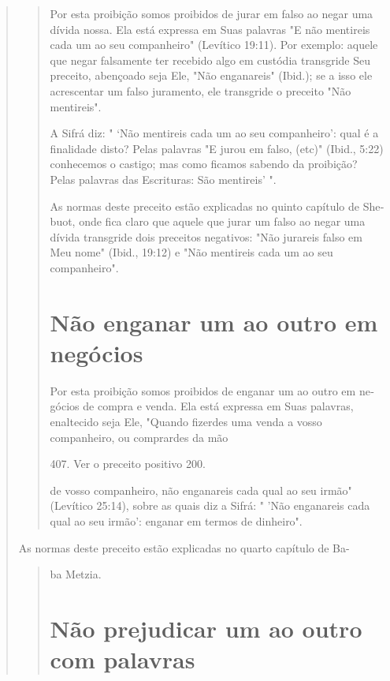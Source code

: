 \begin{quote}
\begin{quote}
Por esta proibição somos proibidos de jurar em falso ao negar uma dívida
nossa. Ela está expressa em Suas palavras "E não mentireis cada um ao
seu companheiro" (Levítico 19:11). Por exemplo: aquele que negar
falsamente ter recebido algo em custódia transgride Seu preceito,
abençoado seja Ele, "Não enganareis" (Ibid.); se a isso ele acrescentar
um falso juramento, ele transgride o preceito "Não mentireis".

A Sifrá diz: " `Não mentireis cada um ao seu companheiro': qual é a
finalidade disto? Pelas palavras "E jurou em falso, (etc)" (Ibid., 5:22)
conhe­cemos o castigo; mas como ficamos sabendo da proibição? Pelas
palavras das Escrituras: São mentireis' ".

As normas deste preceito estão explicadas no quinto capítulo de
She­buot, onde fica claro que aquele que jurar um falso ao negar uma
dívida trans­gride dois preceitos negativos: "Não jurareis falso em Meu
nome" (Ibid., 19:12) e "Não mentireis cada um ao seu companheiro".

\section{Não enganar um ao outro em negócios}

Por esta proibição somos proibidos de enganar um ao outro em ne­gócios
de compra e venda. Ela está expressa em Suas palavras, enaltecido seja
Ele, "Quando fizerdes uma venda a vosso companheiro, ou comprardes da
mão

407. Ver o preceito positivo 200.


de vosso companheiro, não enganareis cada qual ao seu irmão" (Levítico
25:14), sobre as quais diz a Sifrá: " 'Não enganareis cada qual ao seu
irmão': enganar em termos de dinheiro".
\end{quote}

As normas deste preceito estão explicadas no quarto capítulo de Ba-

\begin{quote}
ba Metzia.

\section{Não prejudicar um ao outro com palavras}


\end{quote}
\end{quote}
